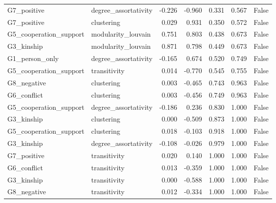 \begin{table}
\begin{tabular}{llrrrrr}
G7_positive & degree_assortativity & -0.226 & -0.960 & 0.331 & 0.567 & False \\
G7_positive & clustering & 0.029 & 0.931 & 0.350 & 0.572 & False \\
G5_cooperation_support & modularity_louvain & 0.751 & 0.803 & 0.438 & 0.673 & False \\
G3_kinship & modularity_louvain & 0.871 & 0.798 & 0.449 & 0.673 & False \\
G1_person_only & degree_assortativity & -0.165 & 0.674 & 0.520 & 0.749 & False \\
G5_cooperation_support & transitivity & 0.014 & -0.770 & 0.545 & 0.755 & False \\
G8_negative & clustering & 0.003 & -0.465 & 0.743 & 0.963 & False \\
G6_conflict & clustering & 0.003 & -0.456 & 0.749 & 0.963 & False \\
G5_cooperation_support & degree_assortativity & -0.186 & 0.236 & 0.830 & 1.000 & False \\
G3_kinship & clustering & 0.000 & -0.509 & 0.873 & 1.000 & False \\
G5_cooperation_support & clustering & 0.018 & -0.103 & 0.918 & 1.000 & False \\
G3_kinship & degree_assortativity & -0.108 & -0.026 & 0.979 & 1.000 & False \\
G7_positive & transitivity & 0.020 & 0.140 & 1.000 & 1.000 & False \\
G6_conflict & transitivity & 0.013 & -0.359 & 1.000 & 1.000 & False \\
G3_kinship & transitivity & 0.000 & -0.588 & 1.000 & 1.000 & False \\
G8_negative & transitivity & 0.012 & -0.334 & 1.000 & 1.000 & False \\
\bottomrule
\end{tabular}
\end{table}
